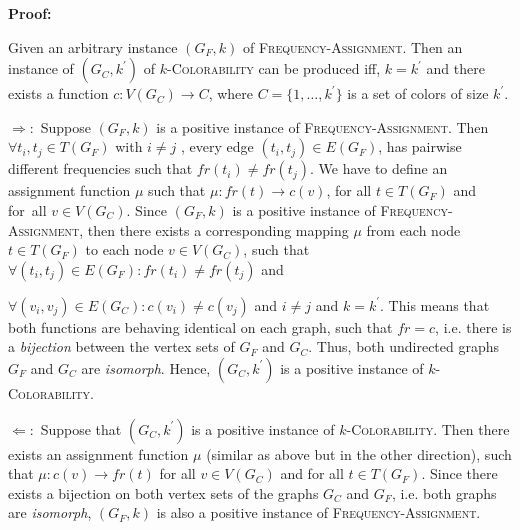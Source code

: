 \noindent\textbf{Proof:}

\noindent Given an arbitrary instance $(G_{F},k)$ of \textsc{Frequency-Assignment}.
Then an instance of $(G_{C},k^{\prime })$ of $k$\textsc{-Colorability} can
be produced iff, $k=k^{\prime }$ and there exists a function $%
c:V(G_{C})\rightarrow C$, where $C=\{1,\ldots ,k^{\prime }\}$ is a set of
colors of size $k^{\prime }$.

\bigskip

$\Rightarrow :$ Suppose $(G_{F},k)$ is a positive instance of \textsc{%
Frequency-Assignment}. Then $\forall t_{i},t_{j}\in T(G_{F})$ with $i\neq j$%
, every edge $(t_{i},t_{j})\in E(G_{F})$, has pairwise different frequencies
such that $fr(t_{i})\neq fr(t_{j})$. We have to define an assignment
function $\mu $ such that $\mu :fr(t)\rightarrow c(v)$, for all $t\in
T(G_{F})$ and for\ all $v\in V(G_{C})$. Since $(G_{F},k)$ is a positive
instance of \textsc{Frequency-Assignment}, then there exists a corresponding
mapping $\mu $ from each node $t\in T(G_{F})$ to each node $v\in V(G_{C})$,
such that $\forall (t_{i},t_{j})\in E(G_{F}):fr(t_{i})\neq fr(t_{j})$ and 

$\forall (v_{i},v_{j})\in E(G_{C}):c(v_{i})\neq c(v_{j})$ and $i\neq j$ and $%
k=k^{\prime }$. This means that both functions are behaving identical on
each graph, such that $fr=c$, i.e. there is a \textit{bijection} between the
vertex sets of $G_{F}$ and $G_{C}$. Thus, both undirected graphs $G_{F}$ and 
$G_{C}$ are \textit{isomorph}. Hence, $(G_{C},k^{\prime })$ is a positive
instance of $k$\textsc{-Colorability}$.$

\bigskip

$\Leftarrow :$ Suppose that $(G_{C},k^{\prime })$ is a positive instance of $%
k$\textsc{-Colorability}. Then there exists an assignment function $\mu $
(similar as above but in the other direction), such that $\mu
:c(v)\rightarrow fr(t)$ for all $v\in V(G_{C})$ and for all $t\in T(G_{F})$.
Since there exists a bijection on both vertex sets of the graphs $G_{C}$ and 
$G_{F}$, i.e. both graphs are \textit{isomorph}, $(G_{F},k)$ is also a
positive instance of \textsc{Frequency-Assignment}.

\bigskip 

